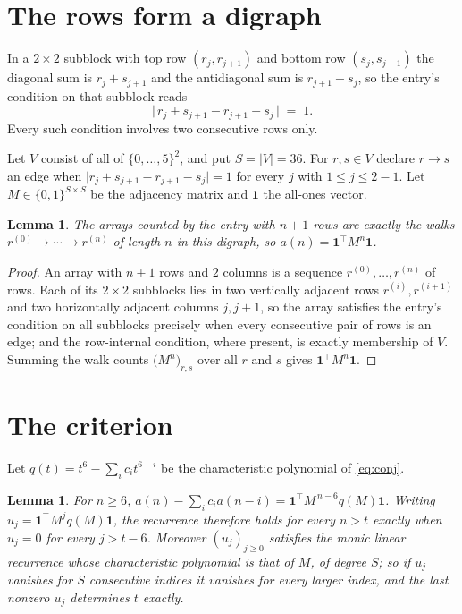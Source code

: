 \documentclass[11pt,a4paper]{article}
\theoremstyle{plain}
\newtheorem{lemma}[theorem]{Lemma}
\theoremstyle{definition}
\begin{document}
\section{The rows form a digraph}

In a $2\times2$ subblock with top row $(r_j,r_{j+1})$ and bottom row $(s_j,s_{j+1})$ the
diagonal sum is $r_j+s_{j+1}$ and the antidiagonal sum is $r_{j+1}+s_j$, so the entry's
condition on that subblock reads
\[
\bigl|\,r_j+s_{j+1}-r_{j+1}-s_j\,\bigr|\;=\;1.
\]
Every such condition involves two consecutive rows only.

Let $V$ consist of all of $\{0,\dots,5\}^{2}$, and put $S=|V|=36$. For $r,s\in V$ declare $r\to s$ an edge
when $\bigl|r_j+s_{j+1}-r_{j+1}-s_j\bigr|=1$ for every $j$ with
$1\le j\le2-1$. Let $M\in\{0,1\}^{S\times S}$ be the adjacency matrix and $\mathbf{1}$
the all-ones vector.

\begin{lemma}\label{lem:walk}
The arrays counted by the entry with $n+1$ rows are exactly the walks
$r^{(0)}\to\cdots\to r^{(n)}$ of length $n$ in this digraph, so
$a(n)=\mathbf{1}^{\!\top}M^{n}\mathbf{1}$.
\end{lemma}

\begin{proof}
An array with $n+1$ rows and $2$ columns is a sequence $r^{(0)},\dots,r^{(n)}$ of
rows. Each of its $2\times2$ subblocks lies in two vertically adjacent rows
$r^{(i)},r^{(i+1)}$ and two horizontally adjacent columns $j,j+1$, so the array satisfies
the entry's condition on all subblocks precisely when every consecutive pair of rows is an
edge; and the row-internal condition, where present, is exactly membership of $V$. Summing
the walk counts $\bigl(M^{n}\bigr)_{r,s}$ over all $r$ and $s$ gives
$\mathbf{1}^{\!\top}M^{n}\mathbf{1}$.
\end{proof}

\section{The criterion}

Let $q(t)=t^{6}-\sum_i c_i t^{6-i}$ be the characteristic polynomial of
\eqref{eq:conj}.

\begin{lemma}\label{lem:crit}
For $n\ge6$,
$a(n)-\sum_i c_i a(n-i)=\mathbf{1}^{\!\top}M^{\,n-6}q(M)\mathbf{1}$. Writing
$u_j=\mathbf{1}^{\!\top}M^{j}q(M)\mathbf{1}$, the recurrence therefore holds for every
$n>t$ exactly when $u_j=0$ for every $j>t-6$. Moreover $(u_j)_{j\ge0}$ satisfies the
monic linear recurrence whose characteristic polynomial is that of $M$, of degree $S$; so
if $u_j$ vanishes for $S$ consecutive indices it vanishes for every larger index, and the
last nonzero $u_j$ determines $t$ exactly.
\end{lemma}
\end{document}
